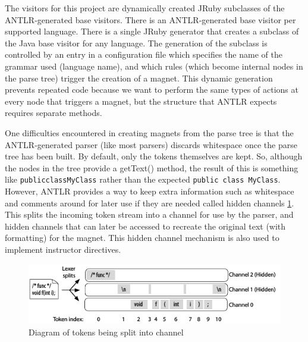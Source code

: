 \documentclass[letter,10pt]{article}
\begin{document}
The visitors for this project are dynamically created JRuby subclasses 
of the ANTLR-generated base visitors. There is an ANTLR-generated base 
visitor per supported language. There is a single JRuby generator that 
creates a subclass of the Java base visitor for any language. The 
generation of the subclass is controlled by an entry in a configuration 
file which specifies the name of the grammar used (language name), and 
which rules (which become internal nodes in the parse tree) trigger the 
creation of a magnet. This dynamic generation prevents repeated code 
because we want to perform the same types of actions at every node that 
triggers a magnet, but the structure that ANTLR expects requires 
separate methods.




One difficulties encountered in creating magnets from the parse tree 
is that the ANTLR-generated parser (like most parsers) discards 
whitespace once the parse tree has been built. By default, only the 
tokens themselves are kept. So, although the nodes in the tree 
provide a getText() method, the result of this is something 
like \verb~publicclassMyClass~ rather than the expected 
\verb~public class MyClass~. However, ANTLR provides a way to keep extra
information such as whitespace and comments around for later use if they 
are needed called hidden channels \ref{fig:channels}. This splits the 
incoming token stream into a channel for use by the parser, and hidden 
channels that can later be accessed to recreate the original text (with 
formatting) for the magnet. This hidden channel mechanism is also used 
to implement instructor directives.

\begin{figure}
 \centering
 \includegraphics{./images/antlr-hidden-channels.png}
 \caption{Diagram of tokens being split into %
channel\cite[207]{antlr-reference}}
 \label{fig:channels}
\end{figure}
\end{document}
